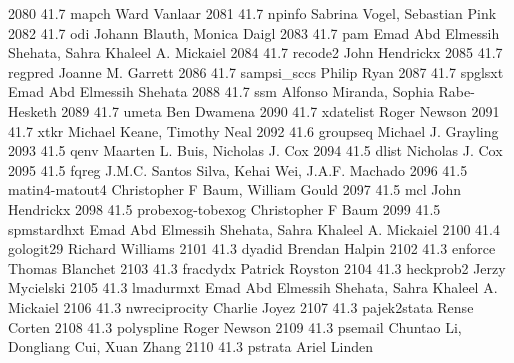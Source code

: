   2080     41.7    mapch         Ward Vanlaar                            
  2081     41.7    npinfo        Sabrina Vogel, Sebastian Pink           
  2082     41.7    odi           Johann Blauth, Monica Daigl             
  2083     41.7    pam           Emad Abd Elmessih Shehata, Sahra        
                                   Khaleel A. Mickaiel                     
  2084     41.7    recode2       John Hendrickx                          
  2085     41.7    regpred       Joanne M. Garrett                       
  2086     41.7    sampsi_sccs   Philip Ryan                             
  2087     41.7    spglsxt       Emad Abd Elmessih Shehata               
  2088     41.7    ssm           Alfonso Miranda, Sophia Rabe-Hesketh    
  2089     41.7    umeta         Ben Dwamena                             
  2090     41.7    xdatelist     Roger Newson                            
  2091     41.7    xtkr          Michael Keane, Timothy Neal             
  2092     41.6    groupseq      Michael J. Grayling                     
  2093     41.5    qenv          Maarten L. Buis, Nicholas J. Cox        
  2094     41.5    dlist         Nicholas J. Cox                         
  2095     41.5    fqreg         J.M.C. Santos Silva, Kehai Wei, J.A.F.  
                                   Machado                                 
  2096     41.5    matin4-matout4  Christopher F Baum, William Gould       
  2097     41.5    mcl           John Hendrickx                          
  2098     41.5    probexog-tobexog  Christopher F Baum                      
  2099     41.5    spmstardhxt   Emad Abd Elmessih Shehata, Sahra        
                                   Khaleel A. Mickaiel                     
  2100     41.4    gologit29     Richard Williams                        
  2101     41.3    dyadid        Brendan Halpin                          
  2102     41.3    enforce       Thomas Blanchet                         
  2103     41.3    fracdydx      Patrick Royston                         
  2104     41.3    heckprob2     Jerzy Mycielski                         
  2105     41.3    lmadurmxt     Emad Abd Elmessih Shehata, Sahra        
                                   Khaleel A. Mickaiel                     
  2106     41.3    nwreciprocity  Charlie Joyez                           
  2107     41.3    pajek2stata   Rense Corten                            
  2108     41.3    polyspline    Roger Newson                            
  2109     41.3    psemail       Chuntao Li, Dongliang Cui, Xuan Zhang   
  2110     41.3    pstrata       Ariel Linden                            
